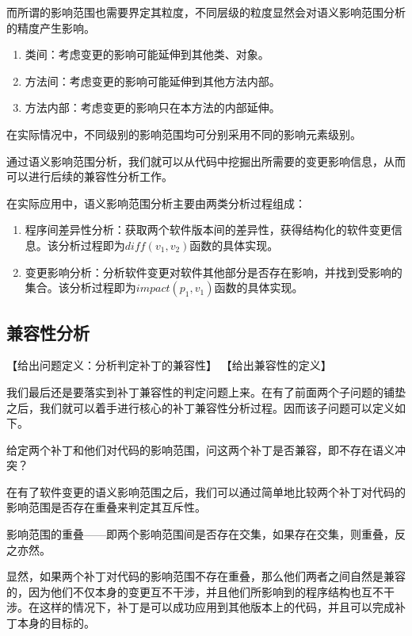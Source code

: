 而所谓的影响范围也需要界定其粒度，不同层级的粒度显然会对语义影响范围分析的精度产生影响。

\begin{enumerate}
	\item 类间：考虑变更的影响可能延伸到其他类、对象。
	\item 方法间：考虑变更的影响可能延伸到其他方法内部。
	\item 方法内部：考虑变更的影响只在本方法的内部延伸。
\end{enumerate}

在实际情况中，不同级别的影响范围均可分别采用不同的影响元素级别。

通过语义影响范围分析，我们就可以从代码中挖掘出所需要的变更影响信息，从而可以进行后续的兼容性分析工作。

在实际应用中，语义影响范围分析主要由两类分析过程组成：
\begin{enumerate}
	\item 程序间差异性分析：获取两个软件版本间的差异性，获得结构化的软件变更信息。该分析过程即为$diff(v_1,v_2)$函数的具体实现。
	\item 变更影响分析：分析软件变更对软件其他部分是否存在影响，并找到受影响的集合。该分析过程即为$impact(p_1,v_1)$函数的具体实现。
\end{enumerate}


\subsection{兼容性分析}

【给出问题定义：分析判定补丁的兼容性】
【给出兼容性的定义】

我们最后还是要落实到补丁兼容性的判定问题上来。在有了前面两个子问题的铺垫之后，我们就可以着手进行核心的补丁兼容性分析过程。因而该子问题可以定义如下。

\begin{problem}
	给定两个补丁和他们对代码的影响范围，问这两个补丁是否兼容，即不存在语义冲突？
\end{problem}

在有了软件变更的语义影响范围之后，我们可以通过简单地比较两个补丁对代码的影响范围是否存在重叠来判定其互斥性。

\begin{definition}
	影响范围的重叠——即两个影响范围间是否存在交集，如果存在交集，则重叠，反之亦然。
\end{definition}

显然，如果两个补丁对代码的影响范围不存在重叠，那么他们两者之间自然是兼容的，因为他们不仅本身的变更互不干涉，并且他们所影响到的程序结构也互不干涉。在这样的情况下，补丁是可以成功应用到其他版本上的代码，并且可以完成补丁本身的目标的。

